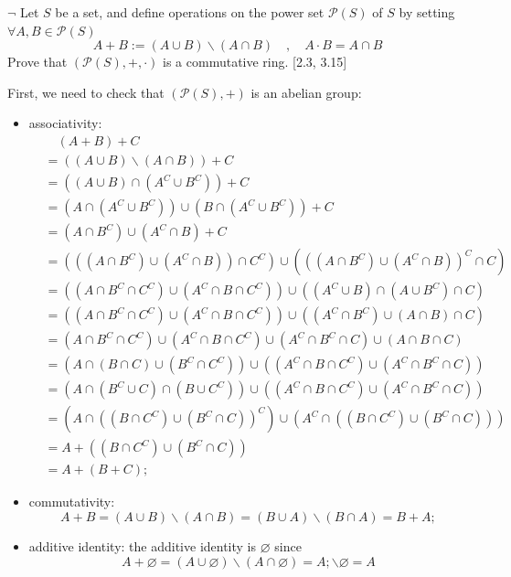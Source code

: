 \documentclass[12pt,letterpaper,boxed]{hmcpset}
\begin{document}
\hypertarget{Exercise III.1.2}{}
\begin{problem}[1.2]
	$\neg$ Let $S$ be a set, and define operations on the power set $\mathscr{P}(S)$ of $S$ by setting $\forall A,B \in \mathscr{P}(S)$
	\[
	A+B :=(A \cup B) \backslash(A \cap B) \quad, \quad A \cdot B=A \cap B
	\]
	Prove that $(\mathscr{P}(S),+,\cdot)$ is a commutative ring. [2.3, 3.15]
\end{problem}
\begin{solution}
	First, we need to check that $(\mathscr{P}(S),+)$ is an abelian group:
	\begin{itemize}
		\item associativity:	
		\begin{align*}
		&\hspace{1em}(A+B)+C\\
		&=((A \cup B) \backslash(A \cap B))+C\\
	    &=((A \cup B) \cap(A^C \cup B^C))+C\\
	    &=(A\cap(A^C \cup B^C) )\cup (B\cap(A^C \cup B^C)) +C\\
	    &=(A \cap B^C) \cup(A^C \cap B)+C\\
	    &=(((A \cap B^C) \cup(A^C \cap B)) \cap C^C) \cup(((A \cap B^C) \cup(A^C \cap B))^C \cap C)\\
	    &=((A \cap B^C\cap C^C )\cup(A^C \cap B\cap C^C) ) \cup((A^C \cup B) \cap(A\cup B^C)\cap C)\\
	    &=((A \cap B^C\cap C^C )\cup(A^C \cap B\cap C^C) ) \cup((A^C\cap B^C) \cup( A\cap B) \cap C)\\
	    &=(A \cap B^C\cap C^C )\cup(A^C \cap B\cap C^C)  \cup(A^C\cap B^C\cap C) \cup( A\cap B\cap C) \\
	    &=(A \cap (B \cap C) \cup(B^C \cap C^C)) \cup((A^C \cap B \cap C^C) \cup (A^C \cap B^C \cap C))\\
	    &=(A \cap (B^C \cup C) \cap(B \cup C^C)) \cup((A^C \cap B \cap C^C) \cup (A^C \cap B^C \cap C))\\
	    &=(A \cap ((B \cap C^C) \cup(B^C \cap C))^C) \cup(A^C \cap ((B \cap C^C) \cup(B^C \cap C)))\\
	    &=A+((B \cap C^C) \cup(B^C \cap C))\\
	    &=A+(B+C);
		\end{align*}
		\item commutativity:
		\[
		A+B =(A \cup B) \backslash(A \cap B)=(B \cup A) \backslash(B \cap A)= B+A;
		\]
		\item additive identity: the additive identity is $\varnothing$ since
		\[
		A+\varnothing=(A \cup \varnothing) \backslash(A \cap \varnothing)=A; \backslash\varnothing=A
\]
\end{itemize}
\end{solution}
\end{document}
